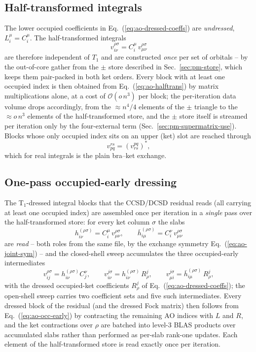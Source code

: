 \documentclass[a4paper,12pt,oneside]{book}
\newcommand{\eq}[1]{Eq.~(\ref{#1})}
\begin{document}
\subsection{Half-transformed integrals}
The lower occupied coefficients in \eq{eq:ao-dressed-coeffs} are \emph{undressed}, $L^\mu_i =
C^\mu_i$. The half-transformed integrals
\begin{equation}
\label{eq:ao-halftrans}
v_{i\nu}^{\rho\sigma} = C^\mu_i\, v_{\mu\nu}^{\rho\sigma}
\end{equation}
are therefore independent of $T_1$ and are constructed \emph{once} per set of orbitals -- by the
out-of-core gather from the $\pm$ store described in Sec.~\ref{sec:pm-store}, which keeps them
pair-packed in both ket orders. Every block with at least one occupied index is then obtained from
\eq{eq:ao-halftrans} by matrix multiplications alone, at a cost of $\mathcal{O}(o\,n^3)$ per block;
the per-iteration data volume drops accordingly, from the $\approx n^4/4$ elements of the $\pm$
triangle to the $\approx o\,n^3$ elements of the half-transformed store, and the $\pm$ store itself
is streamed per iteration only by the four-external term
(Sec.~\ref{sec:pm-supermatrix-use}). Blocks whose only occupied index sits on an upper (ket) slot are reached through
\begin{equation}
v_{pq}^{rs} = \left(v_{rs}^{pq}\right)^*,
\end{equation}
which for real integrals is the plain bra--ket exchange.


\subsection{One-pass occupied-early dressing}
The T$_1$-dressed integral blocks that the CCSD/DCSD residual reads (all carrying at least one
occupied index) are assembled once per iteration in a \emph{single} pass over the half-transformed
store: for every ket column $\sigma$ the slabs
\begin{equation}
\label{eq:ao-occ-early-half}
h^{(\rho\sigma)}_{i\nu} = C^{\mu}_{i}\, v_{\mu\nu}^{\rho\sigma},
\qquad
\bar h^{(\rho\sigma)}_{i\mu} = C^{\nu}_{i}\, v_{\mu\nu}^{\rho\sigma}
\end{equation}
are \emph{read} -- both roles from the same file, by the exchange symmetry \eq{eq:ao-joint-sym} --
and the closed-shell sweep accumulates the three occupied-early intermediates
\begin{equation}
\label{eq:ao-occ-early}
v_{ij}^{\rho\sigma} = h^{(\rho\sigma)}_{i\nu} C^{\nu}_{j},
\qquad
v_{i\nu}^{j\sigma} = h^{(\rho\sigma)}_{i\nu}\, R_{\rho}^{j},
\qquad
v_{\mu i}^{j\sigma} = \bar h^{(\rho\sigma)}_{i\mu}\, R_{\rho}^{j},
\end{equation}
with the dressed occupied-ket coefficients $R^{j}_\rho$ of \eq{eq:ao-dressed-coeffs}; the
open-shell sweep carries two coefficient sets and five such intermediates. Every dressed block of
the residual (and the dressed Fock matrix) then follows from \eq{eq:ao-occ-early} by contracting
the remaining AO indices with $L$ and $R$, and the ket contractions over $\rho$ are batched into
level-3 BLAS products over accumulated slabs rather than performed as per-slab rank-one updates.
Each element of the half-transformed store is read exactly once per iteration.
\end{document}
